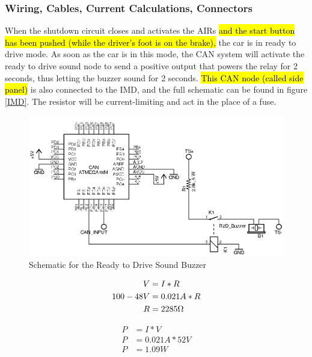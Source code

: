 \documentclass{article}
\DeclareRobustCommand{\hlr}[1]{{\sethlcolor{red}\hl{#1}}}
\begin{document}
        \subsubsection{Wiring, Cables, Current Calculations, Connectors}

            When the shutdown circuit closes and activates the AIRs \hlr{and the start button has been pushed (while the driver's foot is on the brake),} the car is in ready to drive mode. As soon as the car is in this mode, the CAN system will activate the ready to drive sound node to send a positive output that powers the relay for 2 seconds, thus letting the buzzer sound for 2 seconds. \hlr{This CAN node (called side panel)} is also connected to the IMD, and the full schematic can be found in figure \ref{IMD}. The resistor will be current-limiting and act in the place of a fuse.

                \begin{figure}[H]
                    \centering
                    \includegraphics[width = 0.9 \textwidth]{R2Dsoundbuzzerschem}
                    \caption{Schematic for the Ready to Drive Sound Buzzer}
                    \label{R2D}
                \end{figure}

            \begin{align}
                V &= I * R\\
                100-48 V &= 0.021A * R\\
                R &= 2285 \ohm
            \end{align}

            \begin{align}
                P &= I * V \\
                P &= 0.021A * 52 V \\
                P &= 1.09W
            \end{align}
\end{document}
